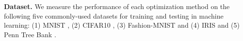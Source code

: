 \noindent \textbf{Dataset.}
We measure the performance of each optimization method on the following five commonly-used datasets for training and testing in machine learning: (1) MNIST \citep{lecun2010mnist}, (2)  CIFAR10 \citep{CIFAR10}, (3) Fashion-MNIST  \citep{xiao2017/online} and (4) IRIS \citep{fisher1936use,anderson1935irises} and (5) Penn Tree Bank \citep{treebank}.


